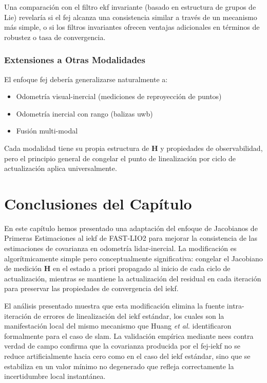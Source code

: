 Una comparación con el filtro \gls{ekf} invariante (basado en estructura de
grupos de Lie) revelaría si el \gls{fej} alcanza una consistencia similar a
través de un mecanismo más simple, o si los filtros invariantes ofrecen
ventajas adicionales en términos de robustez o tasa de convergencia.

\subsubsection{Extensiones a Otras Modalidades}

El enfoque \gls{fej} debería generalizarse naturalmente a:

\begin{itemize}
    \item Odometría visual-inercial (mediciones de reproyección de puntos)
    \item Odometría inercial con rango (balizas \gls{uwb})
    \item Fusión multi-modal
\end{itemize}

Cada modalidad tiene su propia estructura de $\mathbf{H}$ y propiedades de
observabilidad, pero el principio general de congelar el punto de linealización
por ciclo de actualización aplica universalmente.

\section{Conclusiones del Capítulo}
\label{sec:fej-conclusiones}

En este capítulo hemos presentado una adaptación del enfoque de Jacobianos de
Primeras Estimaciones al \gls{iekf} de FAST-LIO2 para mejorar la consistencia
de las estimaciones de covarianza en odometría \gls{lidar}-inercial. La
modificación es algorítmicamente simple pero conceptualmente significativa:
congelar el Jacobiano de medición $\mathbf{H}$ en el estado a priori propagado
al inicio de cada ciclo de actualización, mientras se mantiene la actualización
del residual en cada iteración para preservar las propiedades de convergencia
del \gls{iekf}.

El análisis presentado muestra que esta modificación elimina la fuente
intra-iteración de errores de linealización del \gls{iekf} estándar, los cuales
son la manifestación local del mismo mecanismo que Huang \emph{et al.}
identificaron formalmente para el caso de \gls{slam}. La validación empírica
mediante \gls{nees} contra verdad de campo confirma que la covarianza producida
por el \gls{fej}-\gls{iekf} no se reduce artificialmente hacia cero como en el
caso del \gls{iekf} estándar, sino que se estabiliza en un valor mínimo no
degenerado que refleja correctamente la incertidumbre local instantánea.

